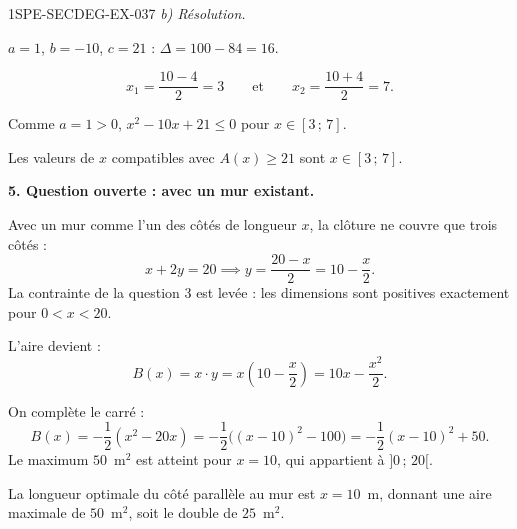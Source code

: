 \begin{corrige}{1SPE-SECDEG-EX-037}
\textit{b) Résolution.}

$a = 1$, $b = -10$, $c = 21$ : $\Delta = 100 - 84 = 16$.

\[x_1 = \frac{10 - 4}{2} = 3 \qquad \text{et} \qquad x_2 = \frac{10 + 4}{2} = 7.\]

Comme $a = 1 > 0$, $x^2 - 10x + 21 \leqslant 0$ pour $x \in [3\,;\,7]$.

Les valeurs de $x$ compatibles avec $A(x) \geqslant 21$ sont $x \in [3\,;\,7]$.

\medskip
\textbf{5. Question ouverte : avec un mur existant.}


Avec un mur comme l'un des côtés de longueur $x$, la clôture ne couvre que trois côtés :
\[x + 2y = 20 \implies y = \frac{20 - x}{2} = 10 - \frac{x}{2}.\]
La contrainte de la question 3 est levée : les dimensions sont positives
exactement pour $0<x<20$.

L'aire devient :
\[B(x) = x \cdot y = x\!\left(10 - \frac{x}{2}\right) = 10x - \frac{x^2}{2}.\]

On complète le carré :
\[B(x)=-\frac{1}{2}(x^2-20x)
=-\frac{1}{2}\bigl((x-10)^2-100\bigr)=-\frac{1}{2}(x-10)^2+50.\]
Le maximum $50$~m$^2$ est atteint pour $x=10$, qui appartient à $]0\,;\,20[$.

La longueur optimale du côté parallèle au mur est $x = 10$~m, donnant une aire maximale de $50$~m$^2$, soit le double de $25$~m$^2$.

\end{corrige}
